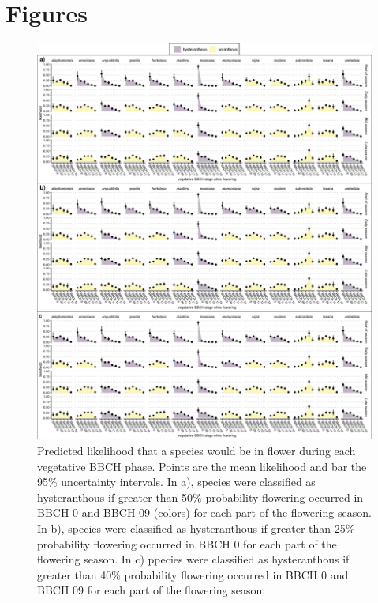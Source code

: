 \documentclass{article}[11pt]
\begin{document}
\section*{Figures} 
\begin{figure}[h!]
    \centering
 \includegraphics[width=.9\textwidth]{..//..//Plots/ord_quants_phylo.jpeg}
    \caption{Predicted likelihood that a species would be in flower during each vegetative BBCH phase. Points are the mean likelihood and bar the 95\% uncertainty intervals. In a), species were classified as hysteranthous if greater than 50\% probability flowering occurred in BBCH 0 and BBCH 09 (colors) for each part of the flowering season. In b), species were classified as hysteranthous if greater than 25\% probability flowering occurred in BBCH 0 for each part of the flowering season. In c) ppecies were classified as hysteranthous if greater than 40\% probability flowering occurred in BBCH 0 and BBCH 09 for each part of the flowering season.}
    \label{fig:plums}
\end{figure}
\end{document}
